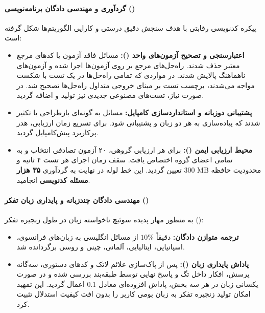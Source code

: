 \paragraph*{گردآوری و مهندسی دادگان برنامه‌نویسی ()}
پیکره کدنویسی رقابتی با هدف سنجش دقیق درستی و کارایی الگوریتم‌ها شکل گرفته است:
\begin{itemize}
    \item \textbf{اعتبارسنجی و تصحیح آزمون‌های واحد ():} مسائل فاقد آزمون یا کدهای مرجع معتبر حذف شدند. راه‌حل‌های مرجع بر روی آزمون‌ها اجرا شده و آزمون‌های ناهماهنگ پالایش شدند. در مواردی که تمامی راه‌حل‌ها در یک تست با شکست مواجه می‌شدند، برچسب تست بر مبنای خروجی متداول راه‌حل‌ها تصحیح شد. در صورت نیاز، تست‌های مصنوعی جدیدی نیز تولید و اضافه گردید.
    \item \textbf{پشتیبانی دوزبانه و استانداردسازی کامپایل:} مسائل به گونه‌ای بازطراحی یا تکثیر شدند که پیاده‌سازی به هر دو زبان  و  پشتیبانی شود. برای تسریع زمان ارزیابی، هدر پرکاربرد  پیش‌کامپایل گردید.
    \item \textbf{محیط ارزیابی ایمن ():} برای هر ارزیابی گروهی، ۲۰ آزمون تصادفی انتخاب و به تمامی اعضای گروه اختصاص یافت. سقف زمان اجرای هر تست ۴ ثانیه و محدودیت حافظه $300\text{ MB}$ تعیین گردید. این خط لوله در نهایت به گردآوری \textbf{۳۵ هزار مسئله کدنویسی} انجامید.
\end{itemize}

\paragraph*{مهندسی دادگان چندزبانه و پایداری زبان تفکر ()}
به منظور مهار پدیده سوئیچ ناخواسته زبان در طول زنجیره تفکر ():
\begin{itemize}
    \item \textbf{ترجمه متوازن دادگان:} دقیقاً $10\%$ از مسائل انگلیسی به زبان‌های فرانسوی، اسپانیایی، ایتالیایی، آلمانی، چینی و روسی برگردانده شد.
    \item \textbf{پاداش پایداری زبان ():} پس از پاک‌سازی علائم لاتک و کدهای دستوری، سه‌گانه پرسش، افکار داخل تگ  و پاسخ نهایی توسط طبقه‌بند  \cite{joulin2016fasttext} بررسی شده و در صورت یکسانی زبان در هر سه بخش، پاداش افزوده‌ای معادل $0.1$ اعمال گردید. این تمهید امکان تولید زنجیره تفکر به زبان بومی کاربر را بدون افت کیفیت استدلال تثبیت کرد.
\end{itemize}

